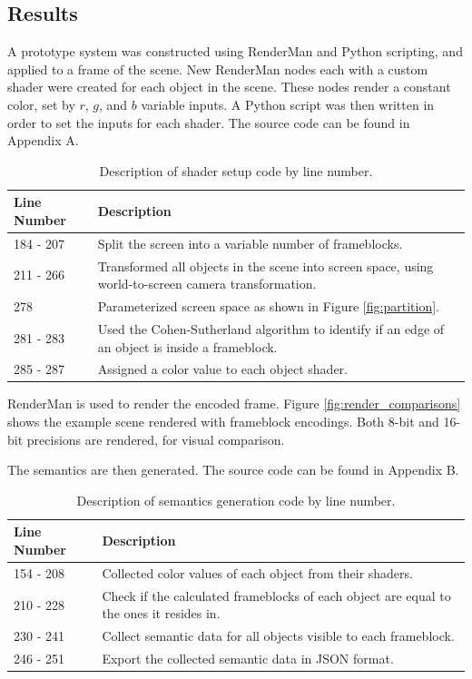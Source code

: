 \documentclass[conference]{IEEEtran}
\begin{document}
\subsection{Results}
A prototype system was constructed using RenderMan
and Python scripting, and applied to a frame of the scene.
New RenderMan nodes each with a custom shader were created for each object in the scene.
These nodes render a constant color, set by $r$, $g$, and $b$ variable inputs.
A Python script was then written in order to set the inputs for each shader.
The source code can be found in Appendix A.
\bigskip
\begin{table}[t]
\begin{centering}
\bgroup
\def\arraystretch{1.5}
\begin{tabular}{| m{} | m{} |} 
\hline
Line Number & Description \\ 
\hline
\hline
184 - 207 & Split the screen into a variable number of frameblocks. \\
211 - 266 & Transformed all objects in the scene into screen space, using world-to-screen camera transformation. \\
278       & Parameterized screen space as shown in Figure \ref{fig:partition}. \\
281 - 283 & Used the Cohen-Sutherland algorithm to identify if an edge of an object is inside a frameblock. \\
285 - 287 & Assigned a color value to each object shader. \\
\hline
\end{tabular}
\caption{Description of shader setup code by line number.}
\label{tbl:fits}
\egroup
\end{centering}
\end{table}
RenderMan is used to render the encoded frame.
Figure \ref{fig:render_comparisons}
shows the example scene rendered with frameblock encodings.
Both 8-bit and 16-bit precisions are rendered, for visual comparison.

The semantics are then generated.
The source code can be found in Appendix B.
\begin{table}[t]
\begin{centering}
\bgroup
\def\arraystretch{1.5}
\begin{tabular}{| m{} | m{} |} 
\hline
Line Number & Description \\ 
\hline
\hline
154 - 208 & Collected color values of each object from their shaders. \\
210 - 228 & Check if the calculated frameblocks of each object are equal to the ones it
resides in. \\
230 - 241 & Collect semantic data for all objects visible to each frameblock. \\
246 - 251 & Export the collected semantic data in JSON format. \\
\hline
\end{tabular}
\caption{Description of semantics generation code by line number.}
\label{tbl:fits}
\egroup
\end{centering}
\end{table}
\end{document}
